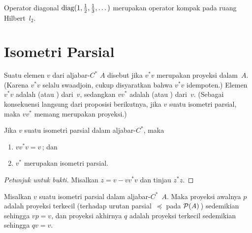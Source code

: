 \begin{exam} Operator diagonal $\operatorname{diag}(1,\frac12,\frac13,\dots)$ merupakan operator kompak pada ruang Hilbert~$l_2$.
\end{exam}











\section{Isometri Parsial}
\begin{defn}  Suatu elemen $v$ dari aljabar-$C^*$ $A$ disebut
 jika $v^*v$ merupakan proyeksi dalam~$A$.  (Karena $v^*v$ selalu
swaadjoin, cukup disyaratkan bahwa $v^*v$ idempoten.)  Elemen $v^*v$ adalah
 (atau
) dari~$v$, sedangkan $vv^*$ adalah 
 (atau
) dari~$v$.  (Sebagai konsekuensi langsung dari proposisi berikutnya,
jika $v$ suatu isometri parsial, maka $vv^*$ memang merupakan proyeksi.)
\end{defn}

\begin{prop}\label{pi0111} Jika $v$ suatu isometri parsial dalam aljabar-$C^*$, maka
 \begin{enumerate}[label=\rm{(\alph*)}]
  \item $vv^*v = v$\,; dan
  \item $v^*$ merupakan isometri parsial.
 \end{enumerate}
\end{prop}

\begin{proof}[\emph{Petunjuk untuk bukti}] Misalkan $z = v - vv^*v$ dan tinjau $z^*z$.  \ns
\end{proof}

\begin{prop}\label{pi0114} Misalkan $v$ suatu isometri parsial dalam aljabar-$C^*$~$A$.  Maka proyeksi awalnya
$p$ adalah proyeksi terkecil (terhadap urutan parsial~$\preceq$
pada $\mathcal{P}(A)$\,) sedemikian sehingga $vp = v$, dan proyeksi akhirnya $q$ adalah proyeksi
terkecil sedemikian sehingga $qv = v$.
\end{prop}

